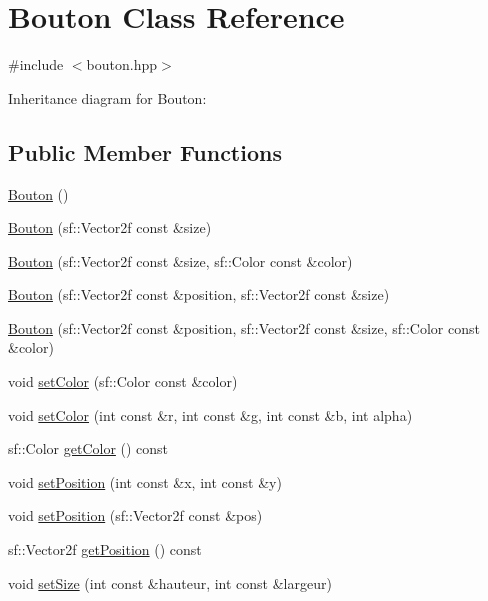 \hypertarget{classBouton}{}\section{Bouton Class Reference}
\label{classBouton}


{\ttfamily \#include $<$bouton.\+hpp$>$}



Inheritance diagram for Bouton\+:
\subsection*{Public Member Functions}
\begin{DoxyCompactItemize}
\item 
\hyperlink{classBouton_ad1e4f684cad81db47393df0be7a65658}{Bouton} ()
\item 
\hyperlink{classBouton_a5e8167b03707ae5bae44cb8f281e9a56}{Bouton} (sf\+::\+Vector2f const \&size)
\item 
\hyperlink{classBouton_a116bf7c1c63d6989dc7b80ed44ac44fd}{Bouton} (sf\+::\+Vector2f const \&size, sf\+::\+Color const \&color)
\item 
\hyperlink{classBouton_a7386d8e7eaa9c48e2c1f051060536999}{Bouton} (sf\+::\+Vector2f const \&position, sf\+::\+Vector2f const \&size)
\item 
\hyperlink{classBouton_ac6a6edb5f25a6f81a0723f5de06110e9}{Bouton} (sf\+::\+Vector2f const \&position, sf\+::\+Vector2f const \&size, sf\+::\+Color const \&color)
\item 
void \hyperlink{classBouton_a0e06118eadd748506d8e0b4c965afd5a}{set\+Color} (sf\+::\+Color const \&color)
\item 
void \hyperlink{classBouton_a24afe0c72297cc0afa04dfa881655a76}{set\+Color} (int const \&r, int const \&g, int const \&b, int alpha)
\item 
sf\+::\+Color \hyperlink{classBouton_af6646f95d000b61b576747235d0ea665}{get\+Color} () const
\item 
void \hyperlink{classBouton_a119371e4b5b8480413cff4f2fb994c80}{set\+Position} (int const \&x, int const \&y)
\item 
void \hyperlink{classBouton_a0e446a7567d7a018492694ee792a46bf}{set\+Position} (sf\+::\+Vector2f const \&pos)
\item 
sf\+::\+Vector2f \hyperlink{classBouton_a496926e39e87be5f946b4c1b53accd21}{get\+Position} () const
\item 
void \hyperlink{classBouton_a2cdcf89c086a350a62eebc56622d17be}{set\+Size} (int const \&hauteur, int const \&largeur)

\end{DoxyCompactItemize}
